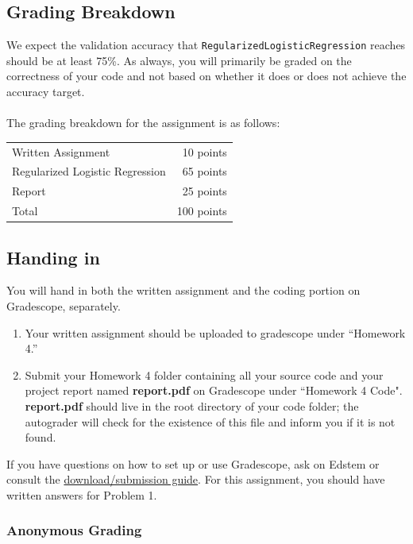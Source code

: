 \documentclass{article}
\begin{document}
\subsection*{Grading Breakdown}
We expect the validation accuracy that \texttt{RegularizedLogisticRegression} reaches should be at least 75\%. As always, you will primarily be graded on the correctness of your code and not based on whether it does or does not achieve the accuracy target.\\ \\
The grading breakdown for the assignment is as follows:
\begin{center}
\begin{tabular}{| l | r |}
    \hline
        Written Assignment & 10 points \\
	Regularized Logistic Regression & 65 points \\
	Report & 25 points \\
	\hline
	Total & 100 points \\
	\hline
\end{tabular}
\end{center}

\subsection*{Handing in}
You will hand in both the written assignment and the coding portion on Gradescope, separately.

\begin{enumerate}
    \item Your written assignment should be uploaded to gradescope under ``Homework 4.''
    \item Submit your Homework 4 folder containing all your source code and your project report named \textbf{report.pdf} on Gradescope under ``Homework 4 Code". \textbf{report.pdf} should live in the root directory of your code folder; the autograder will check for the existence of this file and inform you if it is not found.
\end{enumerate}

\noindent If you have questions on how to set up or use Gradescope, ask on Edstem or consult the \href{https://docs.google.com/document/d/1dYim__KVuE9nZj7RBWr9Mw-S6w6EjeFBbSBDxWWWJFA/edit?usp=sharing}{download/submission guide}. For this assignment, you should have written answers for Problem 1.

\subsubsection*{Anonymous Grading}
\end{document}
